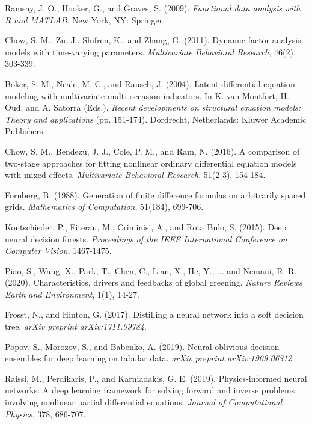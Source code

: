\documentclass{article}
\begin{document}
\begin{thebibliography}{99}
 Ramsay, J. O., Hooker, G., and Graves, S. (2009). \textit{Functional data analysis with R and MATLAB}. New York, NY: Springer.

 Chow, S. M., Zu, J., Shifren, K., and Zhang, G. (2011). Dynamic factor analysis models with time-varying parameters. \textit{Multivariate Behavioral Research}, 46(2), 303-339.

 Boker, S. M., Neale, M. C., and Rausch, J. (2004). Latent differential equation modeling with multivariate multi-occasion indicators. In K. van Montfort, H. Oud, and A. Satorra (Eds.), \textit{Recent developments on structural equation models: Theory and applications} (pp. 151-174). Dordrecht, Netherlands: Kluwer Academic Publishers.

 Chow, S. M., Bendezú, J. J., Cole, P. M., and Ram, N. (2016). A comparison of two-stage approaches for fitting nonlinear ordinary differential equation models with mixed effects. \textit{Multivariate Behavioral Research}, 51(2-3), 154-184.

 Fornberg, B. (1988). Generation of finite difference formulas on arbitrarily spaced grids. \textit{Mathematics of Computation}, 51(184), 699-706.

 Kontschieder, P., Fiterau, M., Criminisi, A., and Rota Bulo, S. (2015). Deep neural decision forests. \textit{Proceedings of the IEEE International Conference on Computer Vision}, 1467-1475.

 Piao, S., Wang, X., Park, T., Chen, C., Lian, X., He, Y., ... and Nemani, R. R. (2020). Characteristics, drivers and feedbacks of global greening. \textit{Nature Reviews Earth and Environment}, 1(1), 14-27.

 Frosst, N., and Hinton, G. (2017). Distilling a neural network into a soft decision tree. \textit{arXiv preprint arXiv:1711.09784}.

 Popov, S., Morozov, S., and Babenko, A. (2019). Neural oblivious decision ensembles for deep learning on tabular data. \textit{arXiv preprint arXiv:1909.06312}.

 Raissi, M., Perdikaris, P., and Karniadakis, G. E. (2019). Physics-informed neural networks: A deep learning framework for solving forward and inverse problems involving nonlinear partial differential equations. \textit{Journal of Computational Physics}, 378, 686-707.


\end{thebibliography}
\end{document}

